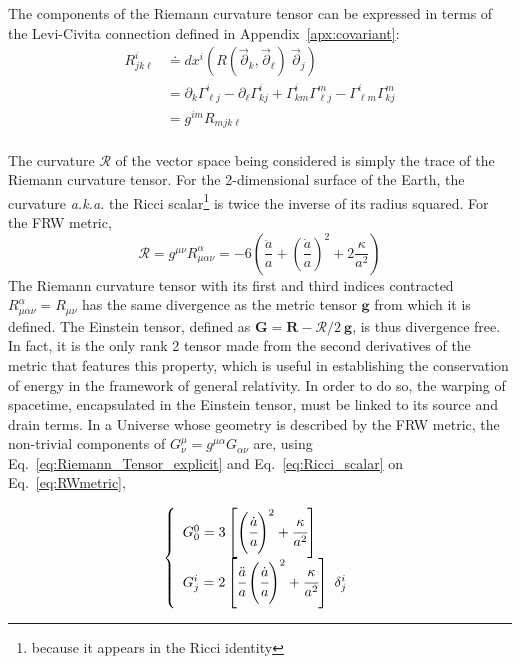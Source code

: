The components of the Riemann curvature tensor can be expressed in terms of the Levi-Civita connection defined in Appendix~\ref{apx:covariant}: \\
\begin{equation}
\label{eq:Riemann_Tensor_explicit}
\begin{array}{cl}
R^i_{jk\ell} &\doteq dx^i \left( R(\vec{\partial}_k, \vec{\partial}_\ell) ~\vec{\partial}_j \right)\\
&= \partial_k \Gamma^i_{\ell j} - \partial_\ell \Gamma^i_{k j} + \Gamma^i_{k m} \Gamma^m_{\ell j} - \Gamma^i_{\ell m} \Gamma^m_{k j}\\
&= g^{im} R_{mjk\ell}
\end{array}
\end{equation} \\ The curvature $\mathcal{R}$ of the vector space being considered is simply the trace of the Riemann curvature tensor. For the 2-dimensional surface of the Earth, the curvature \textit{a.k.a.} the Ricci scalar\footnote{because it appears in the Ricci identity} is twice the inverse of its radius squared. For the FRW metric,
\begin{equation}
\label{eq:Ricci_scalar}
\mathcal{R} = g^{\mu \nu} R^{\alpha}_{\mu  \alpha \nu} = - 6 \left( \frac{\ddot{a}}{a} + \left( \frac{\dot{a}}{a} \right)^2 + 2 \frac{\kappa}{a^2} \right)
\end{equation} The Riemann curvature tensor with its first and third indices contracted $R^{\alpha}_{\mu  \alpha \nu} = R_{\mu \nu}$ has the same divergence as the metric tensor $\pmb{g}$ from which it is defined. The Einstein tensor, defined as $\pmb{G} = \pmb{R} - \mathcal{R}/2 ~\pmb{g}$, is thus divergence free. In fact, it is the only rank 2 tensor made from the second derivatives of the metric that features this property, which is useful in establishing the conservation of energy in the framework of general relativity. In order to do so, the warping of spacetime, encapsulated in the Einstein tensor, must be linked to its source and drain terms. In a Universe whose geometry is described by the FRW metric, the non-trivial components of  $G^\mu_\nu = g^{\mu \alpha} G_{\alpha \nu}$ are, using Eq.~\ref{eq:Riemann_Tensor_explicit} and Eq.~\ref{eq:Ricci_scalar} on Eq.~\ref{eq:RWmetric},

\begin{equation}
\label{eq:einsfrw}
\left\{
\begin{array}{l}
G^0_0 = 3 \left[ \left( \cfrac{\dot{a}}{a} \right)^2 + \cfrac{\kappa}{a^2} \right]\\
G^i_j = 2 \left[ \cfrac{\ddot{a}}{a} \left( \cfrac{\dot{a}}{a} \right)^2 + \cfrac{\kappa}{a^2} \right] ~\delta^i_j
\end{array}
\right.
\end{equation}


